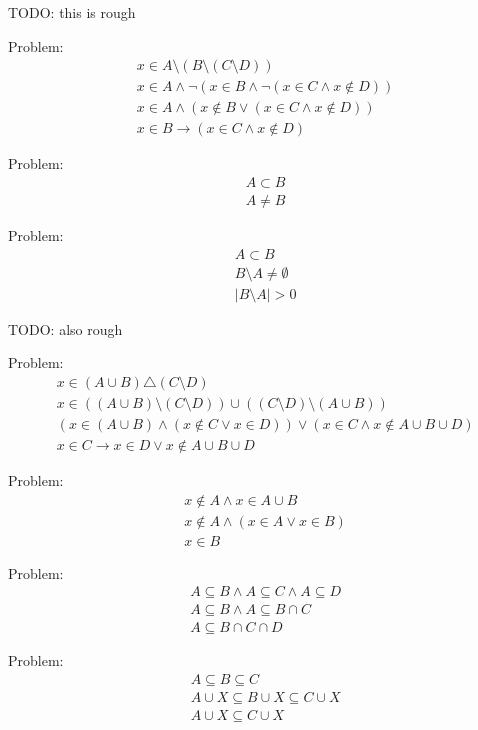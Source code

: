 \documentclass[12pt,letterpaper]{article}
\begin{document}
TODO: this is rough

Problem:
\begin{align}
& x \in A \setminus ( B \setminus ( C \setminus D )) \\
& x \in A \wedge \neg(x \in B \wedge\neg(x \in C \wedge x \notin D )) \\
& x \in A \wedge (x \notin B \vee (x \in C \wedge x \notin D )) \\
& x \in B \rightarrow (x \in C \wedge x \notin D )
\end{align}

Problem:
\begin{align}
& A \subset B \\
& A \neq B
\end{align}

Problem:
\begin{align}
& A \subset B \\
& B \setminus A \neq \emptyset \\
& | B \setminus A | > 0
\end{align}

TODO: also rough

Problem:
\begin{align}
& x \in ( A \cup B ) \triangle ( C \setminus D ) \\
& x \in (( A \cup B ) \setminus ( C \setminus D )) \cup (( C \setminus D ) \setminus ( A \cup B )) \\
& (x \in ( A \cup B ) \wedge (x \notin C \vee x \in D )) \vee (x \in C \wedge x \notin A \cup B \cup D ) \\
& x \in C \rightarrow x \in D \vee x \notin A \cup B \cup D
\end{align}

Problem:
\begin{align}
& x \notin A \wedge x \in A \cup B \\
& x \notin A \wedge (x \in A \vee x \in B ) \\
& x \in B
\end{align}

Problem:
\begin{align}
    & A \subseteq B \wedge A \subseteq C \wedge A \subseteq D \\
    & A \subseteq B \wedge A \subseteq B \cap C \\
    & A \subseteq B \cap C \cap D
\end{align}

Problem:
\begin{align}
    & A \subseteq B \subseteq C \\
    & A \cup X \subseteq B \cup X \subseteq C \cup X \\
    & A \cup X \subseteq C \cup X
\end{align}
\end{document}
